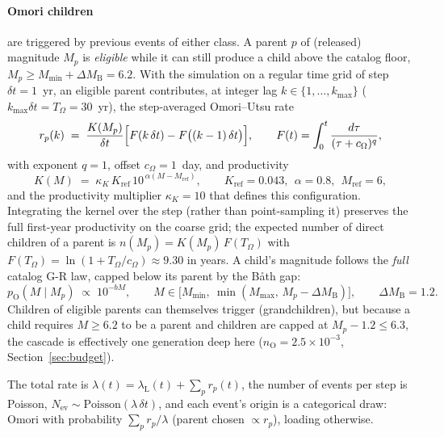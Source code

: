 \documentclass[11pt]{article}
\newcommand{\Mmin}{M_{\min}}
\newcommand{\Mmax}{M_{\max}}
\newcommand{\dM}{\Delta M_{\mathrm{B}}}
\newcommand{\nO}{n_{\mathrm{O}}}
\newcommand{\lamL}{\lambda_{\mathrm{L}}}
\begin{document}
\paragraph{Omori children} are triggered by previous events of either class. A parent
$p$ of (released) magnitude $M_p$ is \emph{eligible} while it can still produce a child
above the catalog floor, $M_p \ge \Mmin + \dM = 6.2$. With the simulation on a regular
time grid of step $\delta t = 1$~yr, an eligible parent contributes, at integer lag
$k \in \{1,\dots,k_{\max}\}$ ($k_{\max}\delta t = T_\Omega = 30$~yr), the step-averaged
Omori--Utsu rate
\begin{equation}
  r_p(k) \;=\; \frac{K(M_p)}{\delta t}\Bigl[F(k\,\delta t) - F\bigl((k-1)\,\delta t\bigr)\Bigr],
  \qquad
  F(t) = \int_0^{t}\frac{d\tau}{(\tau + c_\Omega)^{q}},
\label{eq:omori}
\end{equation}
with exponent $q = 1$, offset $c_\Omega = 1$~day, and productivity
\begin{equation}
  K(M) \;=\; \kappa_K\, K_{\mathrm{ref}}\, 10^{\,\alpha (M - M_{\mathrm{ref}})},
  \qquad K_{\mathrm{ref}} = 0.043,\ \ \alpha = 0.8,\ \ M_{\mathrm{ref}} = 6,
\label{eq:K}
\end{equation}
and the productivity multiplier $\kappa_K = 10$ that defines this configuration.
Integrating the kernel over the step (rather than point-sampling it) preserves the full
first-year productivity on the coarse grid; the expected number of direct children of a
parent is $n(M_p) = K(M_p)\,F(T_\Omega)$ with $F(T_\Omega) = \ln(1 + T_\Omega/c_\Omega)
\approx 9.30$ in years. A child's magnitude follows the \emph{full} catalog G-R law,
capped below its parent by the B\aa th gap:
\begin{equation}
  p_{\mathrm{O}}(M \mid M_p) \;\propto\; 10^{-bM},
  \qquad M \in \bigl[\Mmin,\ \min(\Mmax,\, M_p - \dM)\bigr],
  \qquad \dM = 1.2 .
\label{eq:childlaw}
\end{equation}
Children of eligible parents can themselves trigger (grandchildren), but because a child
requires $M \ge 6.2$ to be a parent and children are capped at $M_p - 1.2 \le 6.3$, the
cascade is effectively one generation deep here ($\nO = 2.5\times10^{-3}$,
Section~\ref{sec:budget}).

The total rate is $\lambda(t) = \lamL(t) + \sum_{p} r_p(t)$, the number of events per
step is Poisson, $N_{\mathrm{ev}} \sim \mathrm{Poisson}(\lambda\,\delta t)$, and each
event's origin is a categorical draw: Omori with probability
$\sum_p r_p/\lambda$ (parent chosen $\propto r_p$), loading otherwise.
\end{document}
